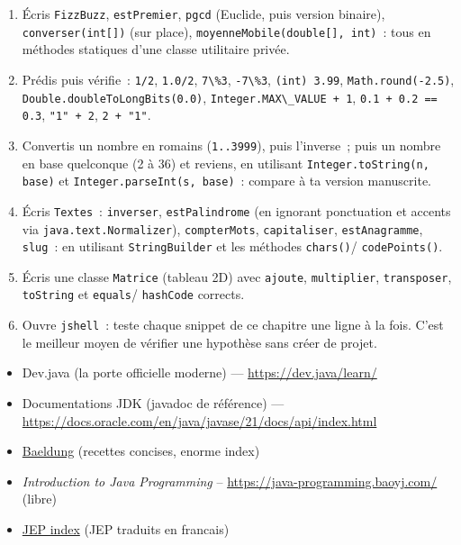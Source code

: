\documentclass[12pt,a4paper,twoside,openright]{book}
\newcommand{\link}[2]{\href{#2}{#1}}
\begin{document}
\begin{exercice}
\begin{enumerate}
  \item \'Ecris \verb|FizzBuzz|, \verb|estPremier|, \verb|pgcd| (Euclide, puis version binaire),
        \verb|converser(int[])| (sur place), \verb|moyenneMobile(double[], int)|~: tous en
        m\'ethodes statiques d'une classe utilitaire priv\'ee.
  \item Pr\'edis puis v\'erifie~: \verb|1/2|, \verb|1.0/2|, \verb|7\%3|, \verb|-7\%3|,
        \verb|(int) 3.99|, \verb|Math.round(-2.5)|, \verb|Double.doubleToLongBits(0.0)|,
        \verb|Integer.MAX\_VALUE + 1|, \verb|0.1 + 0.2 == 0.3|, \verb|"1" + 2|, \verb|2 + "1"|.
  \item Convertis un nombre en romains (\verb|1..3999|), puis l'inverse~; puis un nombre en
        base quelconque (2 \`a 36) et reviens, en utilisant \verb|Integer.toString(n, base)|
        et \verb|Integer.parseInt(s, base)|~: compare \`a ta version manuscrite.
  \item \'Ecris \verb|Textes|~: \verb|inverser|, \verb|estPalindrome| (en ignorant ponctuation et
        accents via \verb|java.text.Normalizer|), \verb|compterMots|, \verb|capitaliser|,
        \verb|estAnagramme|, \verb|slug|~: en utilisant \verb|StringBuilder| et les m\'ethodes
        \verb|chars()|/ \verb|codePoints()|.
  \item \'Ecris une classe \verb|Matrice| (tableau 2D) avec \verb|ajoute|, \verb|multiplier|,
        \verb|transposer|, \verb|toString| et \verb|equals|/ \verb|hashCode| corrects.
  \item Ouvre \verb|jshell|~: teste chaque snippet de ce chapitre une ligne \`a la fois.
        C'est le meilleur moyen de v\'erifier une hypoth\`ese sans cr\'eer de projet.
\end{enumerate}
\end{exercice}

\begin{ressources}
\begin{itemize}
  \item Dev.java (la porte officielle moderne) --- \url{https://dev.java/learn/}
  \item Documentations JDK (javadoc de r\'ef\'erence) --- \url{https://docs.oracle.com/en/java/javase/21/docs/api/index.html}
  \item \link{Baeldung}{https://www.baeldung.com/java-tutorial} (recettes concises, enorme index)
  \item \emph{Introduction to Java Programming} -- \url{https://java-programming.baoyj.com/} (libre)
  \item \link{JEP index}{https://hiphopjava.github.io/jep-in-Java-FR/} (JEP traduits en francais)
\end{itemize}
\end{ressources}
\end{document}
